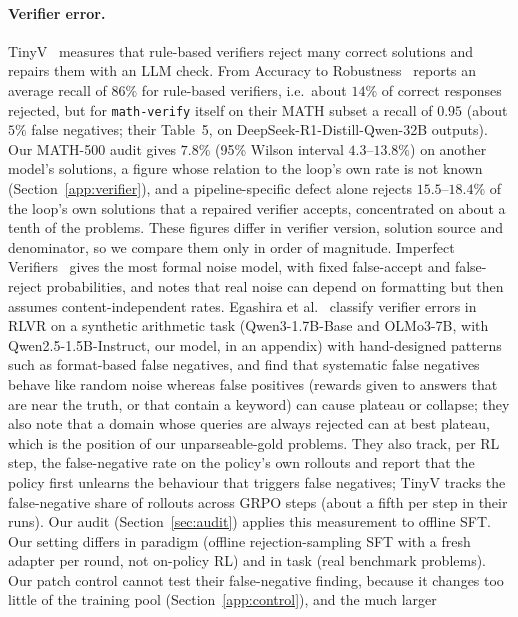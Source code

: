 \documentclass[runningheads]{llncs}
\begin{document}
\paragraph{Verifier error.}
TinyV~\cite{ref_tinyv} measures that rule-based verifiers reject many correct
solutions and repairs them with an LLM check. From Accuracy to
Robustness~\cite{ref_robustness} reports an average recall of $86\%$ for
rule-based verifiers, i.e.\ about $14\%$ of correct responses rejected, but for
\texttt{math-verify} itself on their MATH subset a recall of $0.95$ (about $5\%$
false negatives; their Table~5, on DeepSeek-R1-Distill-Qwen-32B outputs). Our
MATH-500 audit gives $7.8\%$ (95\% Wilson interval $4.3$--$13.8\%$) on another
model's solutions, a figure whose relation to the loop's own rate is not known
(Section~\ref{app:verifier}), and a pipeline-specific defect alone rejects
$15.5$--$18.4\%$ of the loop's own solutions that a repaired verifier accepts, concentrated on about a tenth of the problems. These figures differ in
verifier version, solution source and denominator, so we compare them only in
order of magnitude. Imperfect Verifiers~\cite{ref_imperfect} gives the most formal noise model,
with fixed false-accept and false-reject probabilities, and notes that real noise
can depend on formatting but then assumes content-independent rates. Egashira et
al.~\cite{ref_delayplateau} classify verifier errors in RLVR on a synthetic
arithmetic task (Qwen3-1.7B-Base and OLMo3-7B, with Qwen2.5-1.5B-Instruct, our
model, in an appendix) with hand-designed patterns such as format-based false
negatives, and find that systematic false negatives behave like random noise
whereas false positives (rewards given to answers that are near the truth, or
that contain a keyword) can cause plateau or collapse; they also note that a
domain whose queries are always rejected can at best plateau, which is the
position of our unparseable-gold problems. They also track, per RL step, the
false-negative rate on the policy's own rollouts and report that the policy
first unlearns the behaviour that triggers false negatives; TinyV tracks the
false-negative share of rollouts across GRPO steps (about a fifth per step in
their runs). Our audit (Section~\ref{sec:audit}) applies this measurement to
offline SFT. Our
setting differs in paradigm (offline rejection-sampling SFT with a fresh adapter
per round, not on-policy RL) and in task (real benchmark problems). Our patch
control cannot test their false-negative finding, because it changes too little
of the training pool (Section~\ref{app:control}), and the much larger
\end{document}
